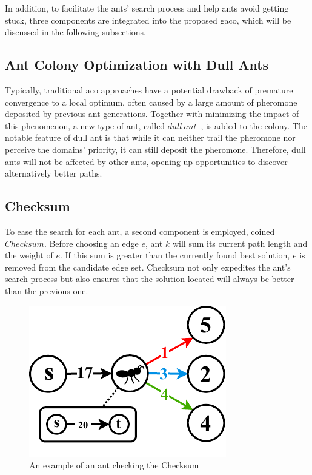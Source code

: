 In addition, to facilitate the ants’ search process and help ants avoid getting stuck, three components are integrated into the proposed \acrshort{gaco}, which will be discussed in the following subsections.

\subsection{Ant Colony Optimization with Dull Ants}
Typically, traditional \gls{aco} approaches have a potential drawback of premature convergence to a local optimum, often caused by a large amount of pheromone deposited by previous ant generations. Together with minimizing the impact of this phenomenon, a new type of ant, called $dull~ant$~\cite{shimomura2010ant}, is added to the colony. The notable feature of dull ant is that while it can neither trail the pheromone nor perceive the domains' priority, it can still deposit the pheromone. Therefore, dull ants will not be affected by other ants, opening up opportunities to discover alternatively better paths.

\subsection{Checksum}
To ease the search for each ant, a second component is employed, coined $Checksum$. Before choosing an edge $e$, ant $k$ will sum its current path length and the weight of $e$. If this sum is greater than the currently found best solution, $e$ is removed from the candidate edge set. Checksum not only expedites the ant's search process but also ensures that the solution located will always be better than the previous one.

\bigskip
\setlength{\intextsep}{3pt}
\renewcommand{\scalefigure}{1.1}
\begin{figure}[htbp]
	\centering
	\includegraphics[scale=\scalefigure]{Figures/chap 3/CheckSum.pdf}
	\caption{An example of an ant checking the Checksum}
	\label{fig:checksum}
\end{figure}
\bigskip

